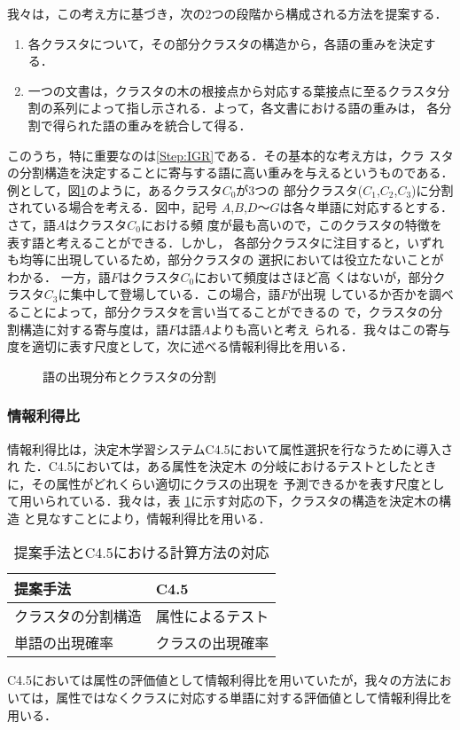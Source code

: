 我々は，この考え方に基づき，次の2つの段階から構成される方法を提案する．
\begin{enumerate}
 \item 各クラスタについて，その部分クラスタの構造から，各語の重みを決定する．
       \label{Step:IGR}
 \item 一つの文書は，クラスタの木の根接点から対応する葉接点に至るクラスタ分
       割の系列によって指し示される．よって，各文書における語の重みは，
       各分割で得られた語の重みを統合して得る．\label{Step:IGRintegrate}
\end{enumerate}
このうち，特に重要なのは\ref{Step:IGR}である．その基本的な考え方は，クラ
スタの分割構造を決定することに寄与する語に高い重みを与えるというものである．
例として，図\ref{Fig:PartitionWordDist}のように，あるクラスタ$C_0$が3つの
部分クラスタ($C_1$,$C_2$,$C_3$)に分割されている場合を考える．図中，記号
$A$,$B$,$D$〜$G$は各々単語に対応するとする．
さて，語$A$はクラスタ$C_0$における頻
度が最も高いので，このクラスタの特徴を表す語と考えることができる．しかし，
各部分クラスタに注目すると，いずれも均等に出現しているため，部分クラスタの
選択においては役立たないことがわかる．
一方，語$F$はクラスタ$C_0$において頻度はさほど高
くはないが，部分クラスタ$C_3$に集中して登場している．この場合，語$F$が出現
しているか否かを調べることによって，部分クラスタを言い当てることができるの
で，クラスタの分割構造に対する寄与度は，語$F$は語$A$よりも高いと考え
られる．我々はこの寄与度を適切に表す尺度として，次に述べる情報利得比を用いる．
\begin{figure}[htbp]
\begin{center}
\end{center}
\caption{語の出現分布とクラスタの分割}
\label{Fig:PartitionWordDist}
\end{figure}


\subsubsection{情報利得比}

情報利得比は，決定木学習システムC4.5において属性選択を行なうために導入され
た\cite{C4.5-E,Mitchell:MachineLearning}．C4.5においては，ある属性を決定木
の分岐におけるテストとしたときに，その属性がどれくらい適切にクラスの出現を
予測できるかを表す尺度として用いられている．我々は，表
\ref{Table:OurMethod_VS_C4.5}に示す対応の下，クラスタの構造を決定木の構造
と見なすことにより，情報利得比を用いる．
\begin{table}[htbp]
\caption{提案手法とC4.5における計算方法の対応}
\label{Table:OurMethod_VS_C4.5}
\begin{center}
\begin{tabular}{|l|l|}
\hline
提案手法         &  C4.5\\
\hline
クラスタの分割構造 & 属性によるテスト\\
単語の出現確率     & クラスの出現確率\\
\hline
\end{tabular}
\end{center}
\end{table}
C4.5においては属性の評価値として情報利得比を用いていたが，我々の方法にお
いては，属性ではなくクラスに対応する単語に対する評価値として情報利得比を
用いる．

